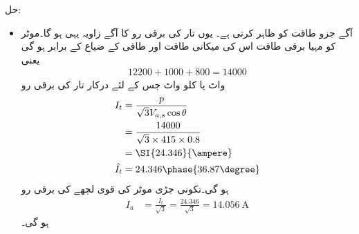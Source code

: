 حل:
\begin{itemize}
\item
{} آگے  جزو طاقت  کو ظاہر کرتی ہے۔ یوں تار کی برقی رو کا آگے زاویہ یہی ہو گا۔موٹر کو مہیا برقی طاقت اس کی میکانی طاقت اور طاقی کے ضیاع کے برابر ہو گی یعنی
\begin{align*}
12200+1000+800=14000
\end{align*}
واٹ یا  کلو واٹ جس  کے لئے درکار تار کی برقی رو 
\begin{align*}
I_t&=\frac{p}{\sqrt{3} V_{a,s} \cos \theta}\\
&=\frac{14000}{\sqrt{3} \times 415 \times 0.8}\\
&=\SI{24.346}{\ampere}\\
\hat{I}_t&=24.346\phase{36.87\degree}
\end{align*}
ہو گی۔تکونی جڑی موٹر کی قوی لچھے کی برقی رو
\begin{align*}
I_a&=\frac{I_t}{\sqrt{3}}=\frac{24.346}{\sqrt{3}}=\SI{14.056}{\ampere}
\end{align*}
ہو گی۔


\end{itemize}
